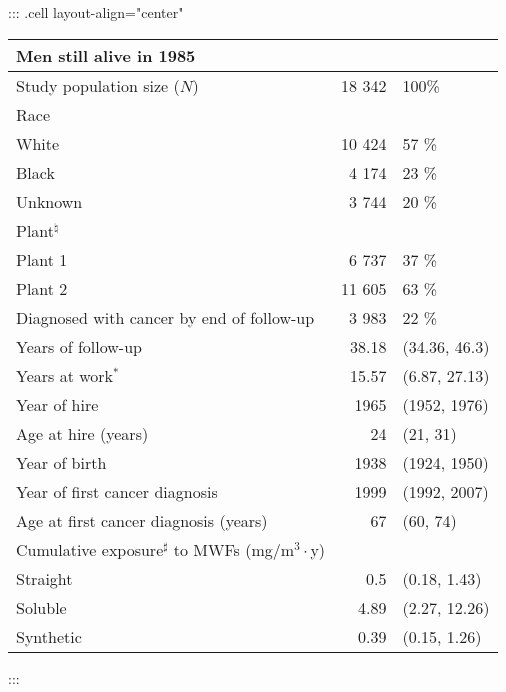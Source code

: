 \documentclass[
  11pt,
  letterpaper,
  DIV=11,
  numbers=noendperiod]{scrartcl}
\theoremstyle{remark}\newtheorem*{claim}{Claim}
\begin{document}
\begin{table}[H]
\centering
::: {.cell layout-align="center"}
\begin{tabular}{lrl}
  \toprule
\multicolumn{3}{l}{Men still alive in 1985}\\%
  \midrule
Study population size ($N$) & 18 342 & 100\% \\ 
  Race &  &  \\ 
  \hspace{10pt}White & 10 424 & 57 \% \\ 
  \hspace{10pt}Black & 4 174 & 23 \% \\ 
  \hspace{10pt}Unknown & 3 744 & 20 \% \\ 
  Plant$^\natural$ &  &  \\ 
  \hspace{10pt}Plant 1 & 6 737 & 37 \% \\ 
  \hspace{10pt}Plant 2 & 11 605 & 63 \% \\ 
  Diagnosed with cancer by end of follow-up & 3 983 & 22 \% \\ 
  \hline Years of follow-up & 38.18 & (34.36, 46.3) \\ 
  Years at work$^*$ & 15.57 & (6.87, 27.13) \\ 
  Year of hire & 1965 & (1952, 1976) \\ 
  Age at hire (years) & 24 & (21, 31) \\ 
  Year of birth & 1938 & (1924, 1950) \\ 
  Year of first cancer diagnosis & 1999 & (1992, 2007) \\ 
  Age at first cancer diagnosis (years) & 67 & (60, 74) \\ 
  Cumulative exposure$^\sharp$ to MWFs (mg/m$^3\cdot$y) &  &  \\ 
  \hspace{10pt}Straight & 0.5 & (0.18, 1.43) \\ 
  \hspace{10pt}Soluble & 4.89 & (2.27, 12.26) \\ 
  \hspace{10pt}Synthetic & 0.39 & (0.15, 1.26) \\ 
   \bottomrule
\end{tabular}
:::
\end{table}

\hypertarget{section-2}{%
\section{}\label{section-2}}
\end{document}
